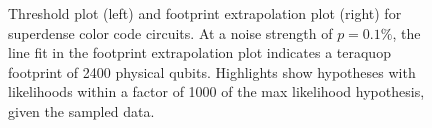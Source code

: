 \documentclass[onecolumn,unpublished,a4paper]{quantumarticle}
\theoremstyle{definition}
\theoremstyle{definition}
\theoremstyle{definition}
\begin{document}
\begin{figure}
    \centering
    \hfill
    \caption{
        Threshold plot (left) and footprint extrapolation plot (right) for superdense color code circuits.
        At a noise strength of $p=0.1\%$, the line fit in the footprint extrapolation plot indicates a teraquop footprint of 2400 physical qubits.
        Highlights show hypotheses with likelihoods within a factor of 1000 of the max likelihood hypothesis, given the sampled data.
    }
    \label{fig:superdense}
\end{figure}
\end{document}
